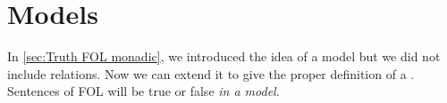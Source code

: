 %
%
%

\section{Models}\label{sec:model}

In \cref{sec:Truth FOL monadic}, we introduced the idea of a model but we did not include relations. Now we can extend it to give the proper definition of a  . Sentences of FOL will be true or false \emph{in a model}.

